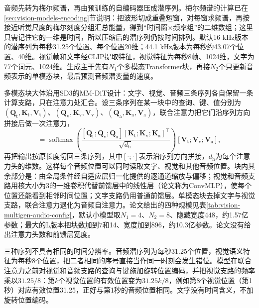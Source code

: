音频先转为梅尔频谱，再由预训练的自编码器压成潜序列。梅尔频谱的计算已在\ref{sec:vision-models-encoding}节说明：把波形切成重叠短窗，对每窗求频谱，再按接近听觉尺度的梅尔刻度分组汇总能量，得到“时间窗$\times$频率组”的二维数组；这里只需记住它的一维是时间，所以压缩后的潜序列仍按时间排列。默认16 kHz版本的潜序列为每秒31.25个位置、每个位置20维；44.1 kHz版本为每秒约43.07个位置、40维。视觉帧和文字经CLIP提取特征，视觉特征为每秒8帧、1024维，文字为77个词元、1024维。生成主干先有$N_1$个多模态Transformer块，再接$N_2$个只更新音频表示的单模态块，最后预测音频潜变量的速度。

多模态块大体沿用SD3的MM-DiT设计：文字、视觉、音频三条序列各自保留一条计算支路，只在注意力处汇合。设三条序列在某一块中的查询、键、值分别为$(\bm Q_{\mathrm t},\bm K_{\mathrm t},\bm V_{\mathrm t})$、$(\bm Q_{\mathrm v},\bm K_{\mathrm v},\bm V_{\mathrm v})$、$(\bm Q_{\mathrm a},\bm K_{\mathrm a},\bm V_{\mathrm a})$，联合注意力把它们沿序列方向拼接后做一次注意力，
\begin{equation}
 [\bm O_{\mathrm t};\bm O_{\mathrm v};\bm O_{\mathrm a}]
 =\operatorname{softmax}\!\left(
   \frac{[\bm Q_{\mathrm t};\bm Q_{\mathrm v};\bm Q_{\mathrm a}]
         [\bm K_{\mathrm t};\bm K_{\mathrm v};\bm K_{\mathrm a}]^\top}{\sqrt{d_{\mathrm h}}}
  \right)[\bm V_{\mathrm t};\bm V_{\mathrm v};\bm V_{\mathrm a}],
 \label{eq:vision-multigen-joint-attention}
\end{equation}
再把输出按原长度切回三条序列，其中$[\cdot;\cdot]$表示沿序列方向拼接，$d_{\mathrm h}$为每个注意力头的维数。这样每个音频位置可以同时读取文字、视觉和其他音频位置。块内其余部分是：由全局条件经自适应层归一化提供的逐通道缩放与偏移；视觉和音频支路用核大小为3的一维卷积代替前馈层中的线性层（论文称为ConvMLP），使每个位置还能看到相邻时间位置；文字支路仍用普通前馈层。单模态块去掉文字与视觉支路，联合注意力退化为音频自注意力。论文给出的四种规模见表\ref{tab:vision-multigen-audio-config}，默认小模型取$N_1=4$、$N_2=8$、隐藏宽度448，约1.57亿参数；最大的L版本把块数加到7和14、宽度加到896，约10.3亿参数。论文没有给出注意力头数和前馈层宽度。

三种序列不具有相同的时间分辨率。音频潜序列为每秒31.25个位置，视觉语义特征为每秒8个位置，把二者相同的序号直接当作同一时刻会发生错位。模型在联合注意力之前对视觉和音频支路的查询与键施加旋转位置编码，并把视觉支路的频率乘以$31.25/8$：第$k$个视觉位置的有效位置变为$31.25k/8$，例如第8个视觉位置（第1秒）对应有效位置31.25，正好与第1秒的音频位置相同。文字没有时间含义，不加旋转位置编码。


